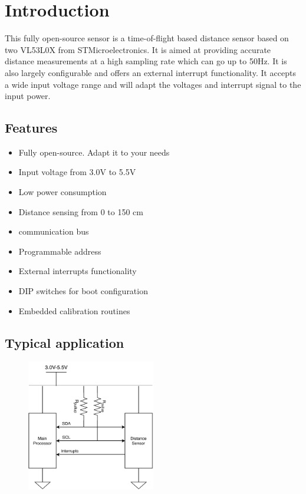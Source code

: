 \section{Introduction}
\begin{multicols}{2}
 This fully open-source sensor is a time-of-flight based distance sensor based on two VL53L0X from STMicroelectronics. It is aimed at providing accurate distance measurements at a high sampling rate which can go up to 50Hz. It is also largely configurable and offers an external interrupt functionality. It accepts a wide input voltage range and will adapt the \iic voltages and interrupt signal to the input power.
 \columnbreak
 \subsection{Features}
 \begin{itemize}
  \item Fully open-source. Adapt it to your needs
  \item Input voltage from 3.0V to 5.5V
  \item Low power consumption
  \item Distance sensing from 0 to 150 cm
  \item \iic communication bus
  \item Programmable \iic address
  \item External interrupts functionality
  \item DIP switches for boot configuration
  \item Embedded calibration routines
 \end{itemize}
\end{multicols}

\subsection{Typical application}

\begin{figure}[h]
 \centering
 \includegraphics[width=0.5\textwidth]{../img/dual-vl53l0x-sensor.pdf}
\end{figure}